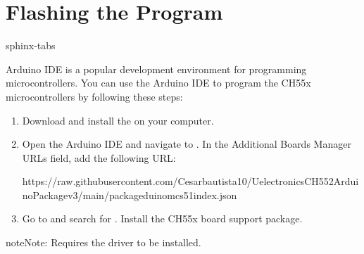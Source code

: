 \documentclass[letterpaper,10pt,english]{sphinxmanual}
\begin{document}
\section{Flashing the Program}
\label{\detokenize{compile:flashing-the-program}}
\begin{sphinxuseclass}{sphinx-tabs}
\sphinxAtStartPar
{}

\sphinxAtStartPar
Arduino IDE is a popular development environment for programming microcontrollers.
You can use the Arduino IDE to program the CH55x microcontrollers by following these steps:
\begin{enumerate}
%
\item {} 
\sphinxAtStartPar
{}

\sphinxAtStartPar
Download and install the  on your computer.

\item {} 
\sphinxAtStartPar
{}

\sphinxAtStartPar
Open the Arduino IDE and navigate to . In the Additional Boards Manager URLs field, add the following URL:

\begin{sphinxVerbatim}[commandchars=\\\{\}]
https://raw.githubusercontent.com/Cesarbautista10/Uelectronics\PYGZhy{}CH552\PYGZhy{}Arduino\PYGZhy{}Package\PYGZhy{}v3/main/package\PYGZus{}duino\PYGZus{}mcs51\PYGZus{}index.json
\end{sphinxVerbatim}

\item {} 
\sphinxAtStartPar
{}

\sphinxAtStartPar
Go to  and search for . Install the CH55x board support package.

\end{enumerate}

\begin{sphinxadmonition}{note}{Note:}
\sphinxAtStartPar
Requires the  driver to be installed.
\end{sphinxadmonition}


\end{sphinxuseclass}
\end{document}
